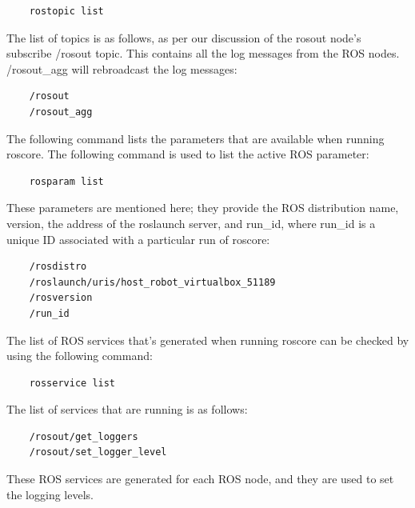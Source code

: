\documentclass[../../main]{subfiles}
\begin{document}
\begin{verbatim}
    rostopic list
\end{verbatim}

The list of topics is as follows, as per our discussion of the rosout node's subscribe /rosout topic. This contains all the log messages from the ROS nodes. /rosout\_agg will rebroadcast the log messages:

\begin{verbatim}
    /rosout
    /rosout_agg
\end{verbatim}

The following command lists the parameters that are available when running roscore. The following command is used to list the active ROS parameter:

\begin{verbatim}
    rosparam list
\end{verbatim}

These parameters are mentioned here; they provide the ROS distribution name, version, the address of the roslaunch server, and run\_id, where run\_id is a unique ID associated with a particular run of roscore:

\begin{verbatim}
    /rosdistro
    /roslaunch/uris/host_robot_virtualbox_51189
    /rosversion
    /run_id
\end{verbatim}

The list of ROS services that's generated when running roscore can be checked by using the following command:

\begin{verbatim}
    rosservice list
\end{verbatim}
The list of services that are running is as follows:
\begin{verbatim}
    /rosout/get_loggers
    /rosout/set_logger_level
\end{verbatim}
These ROS services are generated for each ROS node, and they are used to set the logging
levels.
\end{document}
